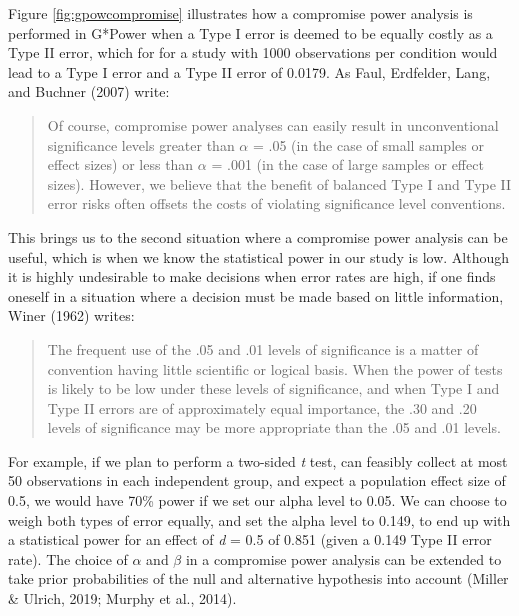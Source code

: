 \documentclass[
  english,
  ,jou, a4paper,floatsintext]{apa6}
\begin{document}
Figure \ref{fig:gpowcompromise} illustrates how a compromise power analysis is performed in G*Power when a Type I error is deemed to be equally costly as a Type II error, which for for a study with 1000 observations per condition would lead to a Type I error and a Type II error of 0.0179. As Faul, Erdfelder, Lang, and Buchner (2007) write:

\begin{quote}
Of course, compromise power analyses can easily result in unconventional significance levels greater than \(\alpha\) = .05 (in the case of small samples or effect sizes) or less than \(\alpha\) = .001 (in the case of large samples or effect sizes). However, we believe that the benefit of balanced Type I and Type II error risks often offsets the costs of violating significance level conventions.
\end{quote}

This brings us to the second situation where a compromise power analysis can be useful, which is when we know the statistical power in our study is low. Although it is highly undesirable to make decisions when error rates are high, if one finds oneself in a situation where a decision must be made based on little information, Winer (1962) writes:

\begin{quote}
The frequent use of the .05 and .01 levels of significance is a matter of convention having little scientific or logical basis. When the power of tests is likely to be low under these levels of significance, and when Type I and Type II errors are of approximately equal importance, the .30 and .20 levels of significance may be more appropriate than the .05 and .01 levels.
\end{quote}

For example, if we plan to perform a two-sided \emph{t} test, can feasibly collect at most 50 observations in each independent group, and expect a population effect size of 0.5, we would have 70\% power if we set our alpha level to 0.05. We can choose to weigh both types of error equally, and set the alpha level to 0.149, to end up with a statistical power for an effect of \emph{d} = 0.5 of 0.851 (given a 0.149 Type II error rate). The choice of \(\alpha\) and \(\beta\) in a compromise power analysis can be extended to take prior probabilities of the null and alternative hypothesis into account (Miller \& Ulrich, 2019; Murphy et al., 2014).
\end{document}
